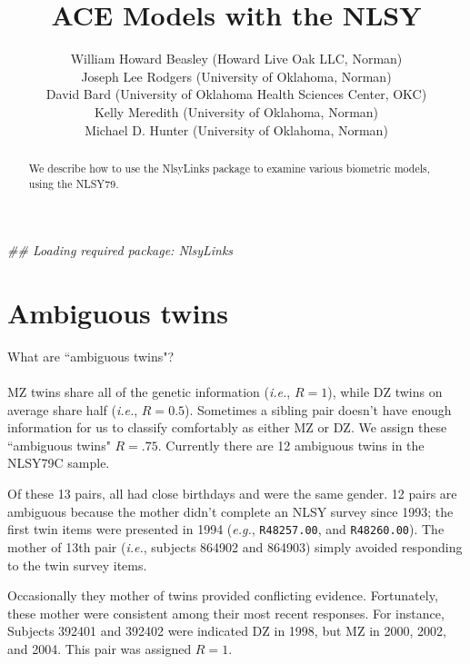 \documentclass[letter]{article}\usepackage{graphicx, color}
\title{ACE Models with the NLSY}
\author{William Howard Beasley (Howard Live Oak LLC, Norman)\\
Joseph Lee Rodgers (University of Oklahoma, Norman)\\
David Bard (University of Oklahoma Health Sciences Center, OKC)\\
Kelly Meredith (University of Oklahoma, Norman)\\
Michael D. Hunter (University of Oklahoma, Norman)
}
\makeatletter
\newenvironment{kframe}{%
 \def\at@end@of@kframe{}%
 \ifinner\ifhmode%
  \def\at@end@of@kframe{\end{minipage}}%
  \begin{minipage}{\columnwidth}%
 \fi\fi%
 \def\FrameCommand##1{\hskip\@totalleftmargin \hskip-\fboxsep
 \colorbox{shadecolor}{##1}\hskip-\fboxsep
     \hskip-\linewidth \hskip-\@totalleftmargin \hskip\columnwidth}%
 \MakeFramed {\advance\hsize-\width
   \@totalleftmargin\z@ \linewidth\hsize
   \@setminipage}}%
 {\par\unskip\endMakeFramed%
 \at@end@of@kframe}
\newenvironment{knitrout}{}{} %
\makeatother
\begin{document}
\newcommand{\code}[1]{\texttt{\small{#1}}}
\newcommand{\pkg}[1]{\textsf{\small{#1}}}
\newcommand{\R}{\textsf{R}} %

\maketitle
\begin{abstract}
   We describe how to use the \pkg{NlsyLinks} package to examine various biometric models, using the NLSY79.
\end{abstract}
\tableofcontents
\begin{knitrout}
\color{fgcolor}\begin{kframe}


{\ttfamily\noindent\itshape\textcolor{messagecolor}{\#\# Loading required package: NlsyLinks}}\end{kframe}
\end{knitrout}

\section{Ambiguous twins}
\textsf{What are ``ambiguous twins"?}\\ \\
MZ twins share all of the genetic information (\emph{i.e.}, $R=1$), while DZ twins on average share half (\emph{i.e.}, $R=0.5$).  Sometimes a sibling pair doesn't have enough information for us to classify comfortably as either MZ or DZ.  We assign these ``ambiguous twins" $R=.75$.  Currently there are 12 ambiguous twins in the NLSY79C sample.  

Of these 13 pairs, all had close birthdays and were the same gender.  12 pairs are ambiguous because the mother didn't complete an NLSY survey since 1993; the first twin items were presented in 1994 (\emph{e.g.}, \code{R48257.00}, and \code{R48260.00}).  The mother of 13th pair (\emph{i.e.}, subjects 864902 and 864903) simply avoided responding to the twin survey items.

Occasionally they mother of twins provided conflicting evidence. Fortunately, these mother were consistent among their most recent responses.  For instance, Subjects 392401 and 392402 were indicated DZ in 1998, but MZ in 2000, 2002, and 2004.  This pair was assigned $R=1$.
\end{document}
